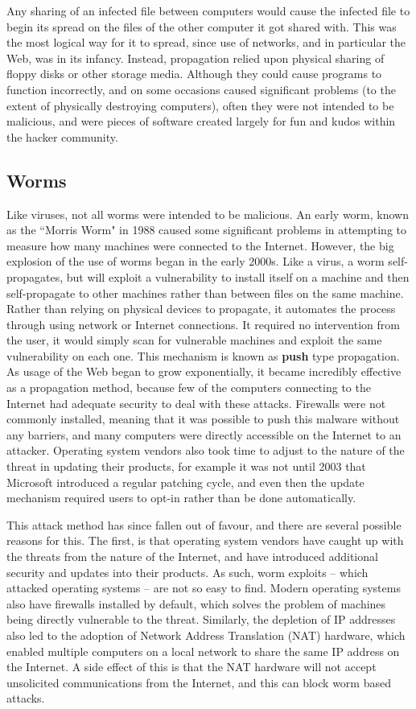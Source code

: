 \documentclass{acm_proc_article-sp}
\begin{document}
Any sharing of an infected file between computers would cause the infected file to begin its spread on the files of the other computer it got shared with.  This was the most logical way for it to spread, since use of networks, and in particular the Web, was in its infancy.  Instead, propagation relied upon physical sharing of floppy disks or other storage media.  Although they could cause programs to function incorrectly, and on some occasions caused significant problems (to the extent of physically destroying computers), often they were not intended to be malicious, and were pieces of software created largely for fun and kudos within the hacker community.

\subsection{Worms}
Like viruses, not all worms were intended to be malicious.  An early worm, known as the ``Morris Worm" in 1988 caused some significant problems in attempting to measure how many machines were connected to the Internet.  However, the big explosion of the use of worms began in the early 2000s.  Like a virus, a worm self-propagates, but will exploit a vulnerability to install itself on a machine and then self-propagate to other machines rather than between files on the same machine.  Rather than relying on physical devices to propagate, it automates the process through using network or Internet connections.  It required no intervention from the user, it would simply scan for vulnerable machines and exploit the same vulnerability on each one.  This mechanism is known as \textbf{push} type propagation.  As usage of the Web began to grow exponentially, it became incredibly effective as a propagation method, because few of the computers connecting to the Internet had adequate security to deal with these attacks.  Firewalls were not commonly installed, meaning that it was possible to push this malware without any barriers, and many computers were directly accessible on the Internet to an attacker.  Operating system vendors also took time to adjust to the nature of the threat in updating their products, for example it was not until 2003 that Microsoft introduced a regular patching cycle, and even then the update mechanism required users to opt-in rather than be done automatically.

This attack method has since fallen out of favour, and there are several possible reasons for this.  The first, is that operating system vendors have caught up with the threats from the nature of the Internet, and have introduced additional security and updates into their products.  As such, worm exploits -- which attacked operating systems -- are not so easy to find.  Modern operating systems also have firewalls installed by default, which solves the problem of machines being directly vulnerable to the threat.  Similarly, the depletion of IP addresses also led to the adoption of Network Address Translation (NAT) hardware, which enabled multiple computers on a local network to share the same IP address on the Internet.  A side effect of this is that the NAT hardware will not accept unsolicited communications from the Internet, and this can block worm based attacks.
\end{document}
